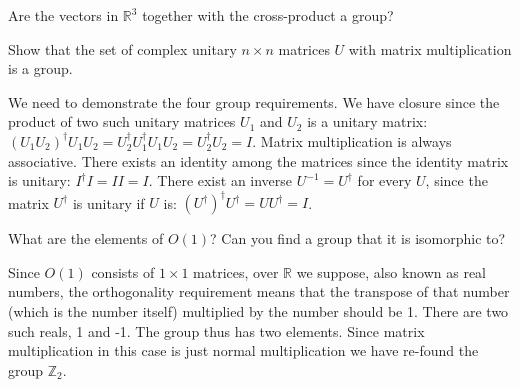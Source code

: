 \documentclass[notes.tex]{subfiles}
\begin{document}
\begin{Exercise}[]
Are the vectors in $\mathbb R^3$ together with the cross-product a group?
\end{Exercise}

\begin{Exercise}[]
Show that the set of complex unitary $n\times n$ matrices $U$ with matrix multiplication is a group.
\end{Exercise}
\begin{Answer}
We need to demonstrate the four group requirements. We have closure since the product of two such unitary matrices $U_1$ and $U_2$ is a unitary matrix: $(U_1U_2)^\dagger U_1U_2= U_2^\dagger U_1^\dagger U_1U_2= U_2^\dagger U_2=I$. Matrix multiplication is always associative. There exists an identity among the matrices since the identity matrix is unitary: $I^\dagger I = II=I$. There exist an inverse $U^{-1}=U^\dagger$ for every $U$, since the matrix $U^\dagger$ is unitary if $U$ is: $(U^\dagger)^\dagger U^\dagger= UU^\dagger=I$.
\end{Answer}

\begin{Exercise}[]
What are the elements of $O(1)$? Can you find a group that it is isomorphic to?
\end{Exercise}
\begin{Answer}
Since $O(1)$ consists of $1\times1$ matrices, over $\mathbb R$ we suppose, also known as real numbers, the orthogonality requirement means that the transpose of that number (which is the number itself) multiplied by the number should be 1. There are two such reals, 1 and -1. The group thus has two elements. Since matrix multiplication in this case is just normal multiplication we have re-found the group $\mathbb Z_2$.
\end{Answer}
\end{document}
